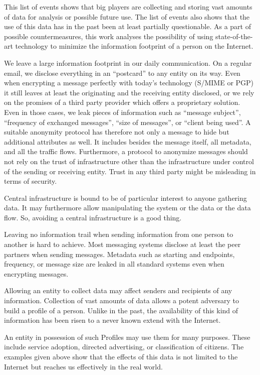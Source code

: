 \documentclass[10pt,journal,compsoc]{IEEEtran}
\begin{document}
This list of events shows that big players are collecting and storing vast amounts of data for analysis or possible future use. The list of events also shows that the use of this data has in the past been at least partially questionable. As a part of possible countermeasures, this work analyses the possibility of using state-of-the-art technology to minimize the information footprint of a person on the Internet. 

We leave a large information footprint in our daily communication. On a regular email, we disclose everything in an ``postcard'' to any entity on its way. Even when encrypting a message perfectly with today's technology (S/MIME\cite{RFC2045} or PGP\cite{RFC2015}) it still leaves at least the originating and the receiving entity disclosed, or we rely on the promises of a third party provider which offers a proprietary solution. Even in those cases, we leak pieces of information such as ``message subject'', ``frequency of exchanged messages'', ``size of messages'', or ``client being used''. A suitable anonymity protocol has therefore not only a message to hide but additional attributes as well. It includes besides the message itself, all metadata, and all the traffic flows. Furthermore, a protocol to anonymize messages should not rely on the trust of infrastructure other than the infrastructure under control of the sending or receiving entity. Trust in any third party might be misleading in terms of security.

Central infrastructure is bound to be of particular interest to anyone gathering data. It may furthermore allow manipulating the system or the data or the data flow. So, avoiding a central infrastructure is a good thing.

Leaving no information trail when sending information from one person to another is hard to achieve. Most messaging systems disclose at least the peer partners when sending messages. Metadata such as starting and endpoints, frequency, or message size are leaked in all standard systems even when encrypting messages.

Allowing an entity to collect data may affect senders and recipients of any information. Collection of vast amounts of data allows a potent adversary to build a  profile of a person. Unlike in the past, the availability of this kind of information has been risen to a never known extend with the Internet.

An entity in possession of such Profiles may use them for many purposes. These include service adoption, directed advertising, or classification of citizens. The examples given above show that the effects of this data is not limited to the Internet but reaches us effectively in the real world.
\end{document}

